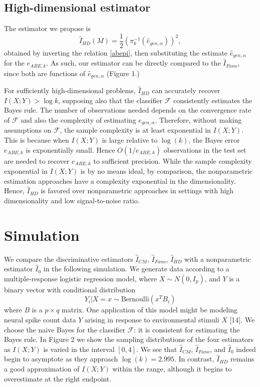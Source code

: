 \documentclass{article}
\begin{document}
\subsection{High-dimensional estimator}

The estimator we propose is
\[
\hat{I}_{HD}(M) = \frac{1}{2}(\pi_{k}^{-1}(\hat{e}_{gen, \alpha}))^2,
\]
obtained by inverting the relation \eqref{abepi}, then substituting
the estimate $\hat{e}_{gen, \alpha}$ for the $e_{ABE, k}$.  As such,
our estimator can be directly compared to the $\hat{I}_{Fano}$, since
both are functions of $\hat{e}_{gen,\alpha}$ (Figure 1.)

For sufficiently high-dimensional problems, $\hat{I}_{HD}$ can
accurately recover $I(X; Y) > \log k$, supposing also that the
classifier $\mathcal{F}$ consistently estimates the Bayes rule.  The
number of observations needed depends on the convergence rate of
$\mathcal{F}$ and also the complexity of estimating $e_{gen, \alpha}$.
Therefore, without making assumptions on $\mathcal{F}$, the sample
complexity is at least exponential in $I(X; Y)$.  This is because when
$I(X; Y)$ is large relative to $\log(k)$, the Bayes error $e_{ABE, k}$
is exponentially small.  Hence $O(1/e_{ABE, k})$ observations in the
test set are needed to recover $e_{ABE, k}$ to sufficient precision.
While the sample complexity exponential in $I(X; Y)$ is by no means
ideal, by comparison, the nonparametric estimation approaches have a
complexity exponential in the dimensionality.  Hence, $\hat{I}_{HD}$
is favored over nonparametric approaches in settings with high
dimensionality and low signal-to-noise ratio.


\section{Simulation}

We compare the discriminative estimators $\hat{I}_{CM}$,
$\hat{I}_{Fano}$, $\hat{I}_{HD}$ with a nonparametric estimator
$\hat{I}_0$ in the following simulation.  We generate data according
to a multiple-response logistic regression model, where $ X \sim N(0,
I_p) $, and $Y$ is a binary vector with conditional distribution
\[
Y_i|X = x \sim \text{Bernoulli}(x^T B_i)
\]
where $B$ is a $p \times q$ matrix.  One application of this model
might be modeling neural spike count data $Y$ arising in response to
environmental stimuli $X$ [14].  We choose the naive Bayes for the
classifier $\mathcal{F}$: it is consistent for estimating the Bayes
rule.  In Figure 2 we show the sampling distributions of the four
estimators as $I(X; Y)$ is varied in the interval $[0, 4]$.  We see
that $\hat{I}_{CM}$, $\hat{I}_{Fano}$, and $\hat{I}_0$ indeed begin to
asymptote as they approach $\log(k) = 2.995$.  In contrast,
$\hat{I}_{HD}$ remains a good approximation of $I(X; Y)$ within the
range, although it begins to overestimate at the right endpoint.
\end{document}
